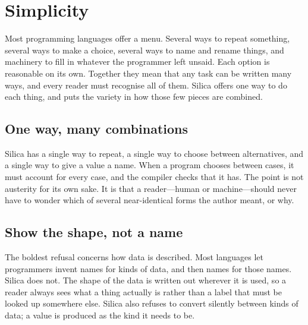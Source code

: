 \chapter{Simplicity}
\label{ch:oneway}

Most programming languages offer a menu. Several ways to repeat something,
several ways to make a choice, several ways to name and rename things, and
machinery to fill in whatever the programmer left unsaid. Each option is
reasonable on its own. Together they mean that any task can be written many
ways, and every reader must recognise all of them. Silica offers one way to do
each thing, and puts the variety in how those few pieces are combined.

\section{One way, many combinations}

Silica has a single way to repeat, a single way to choose between
alternatives, and a single way to give a value a name. When a program chooses
between cases, it must account for every case, and the compiler checks that it
has. The point is not austerity for its own sake. It is that a reader---human or
machine---should never have to wonder which of several near-identical forms the
author meant, or why.

\section{Show the shape, not a name}

The boldest refusal concerns how data is described. Most languages let
programmers invent names for kinds of data, and then names for those names.
Silica does not. The shape of the data is written out wherever it is used, so a
reader always sees what a thing actually is rather than a label that must be
looked up somewhere else. Silica also refuses to convert silently between kinds
of data; a value is produced as the kind it needs to be.

